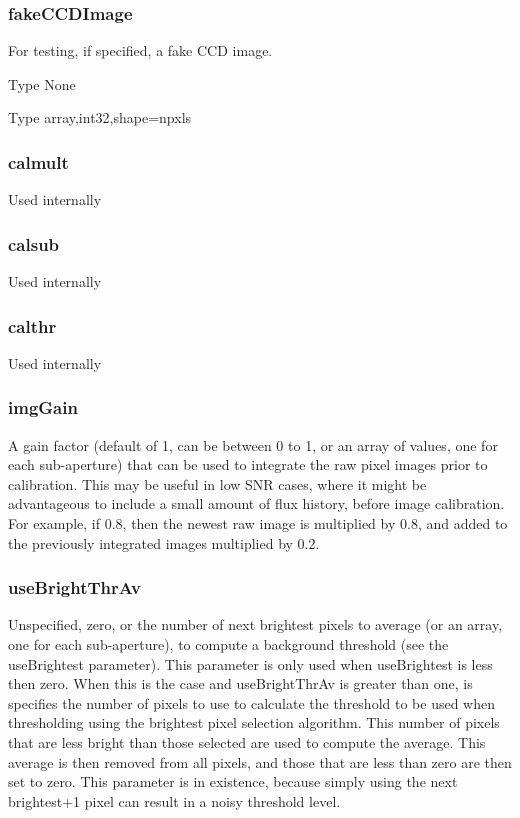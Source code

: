 \documentclass[a4,10pt]{article}
\begin{document}
\subsubsection{fakeCCDImage}
For testing, if specified, a fake CCD image.

Type None

Type array,int32,shape=npxls

\subsubsection{calmult}
Used internally
\subsubsection{calsub}
Used internally
\subsubsection{calthr}
Used internally

\subsubsection{imgGain}
A gain factor (default of 1, can be between 0 to 1, or an array of
values, one for each sub-aperture) that can be used to integrate the
raw pixel images prior to calibration.  This may be useful in low SNR
cases, where it might be advantageous to include a small amount of
flux history, before image calibration.  For example, if 0.8, then the
newest raw image is multiplied by 0.8, and added to the previously
integrated images multiplied by 0.2.

\subsubsection{useBrightThrAv}
Unspecified, zero, or the number of next brightest pixels to average
(or an array, one for each sub-aperture),
to compute a background threshold (see the useBrightest parameter).
This parameter is only used when useBrightest is less then zero.  When
this is the case and useBrightThrAv is greater than one, is specifies
the number of pixels to use to calculate the threshold to be used when
thresholding using the brightest pixel selection algorithm.  This
number of pixels that are less bright than those selected are used to
compute the average.  This average is then removed from all pixels,
and those that are less than zero are then set to zero.  This
parameter is in existence, because simply using the next brightest+1
pixel can result in a noisy threshold level.
\end{document}
